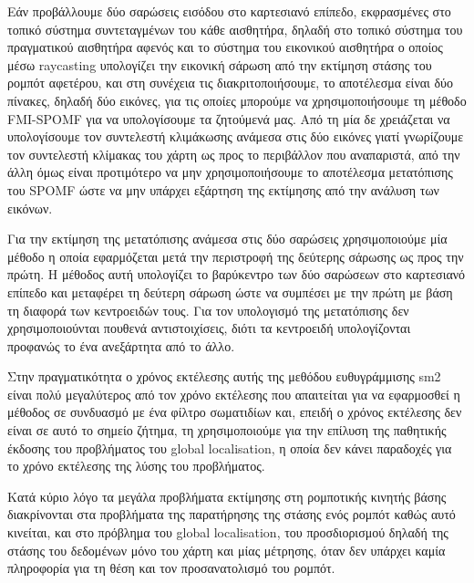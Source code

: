 \documentclass[a4paper,10pt]{article}
\begin{document}
Εάν προβάλλουμε δύο σαρώσεις εισόδου στο καρτεσιανό επίπεδο, εκφρασμένες στο
τοπικό σύστημα συντεταγμένων του κάθε αισθητήρα, δηλαδή στο τοπικό σύστημα του
πραγματικού αισθητήρα αφενός και το σύστημα του εικονικού αισθητήρα ο οποίος
μέσω raycasting υπολογίζει την εικονική σάρωση από την εκτίμηση στάσης του
ρομπότ αφετέρου, και στη συνέχεια τις διακριτοποιήσουμε, το αποτέλεσμα είναι
δύο πίνακες, δηλαδή δύο εικόνες, για τις οποίες μπορούμε να
χρησιμοποιήσουμε τη μέθοδο FMI-SPOMF για να υπολογίσουμε τα ζητούμενά μας.  Από
τη μία δε χρειάζεται να υπολογίσουμε τον συντελεστή κλιμάκωσης ανάμεσα στις δύο
εικόνες γιατί γνωρίζουμε τον συντελεστή κλίμακας του χάρτη ως προς το
περιβάλλον που αναπαριστά, από την άλλη όμως είναι προτιμότερο να μην
χρησιμοποιήσουμε το αποτέλεσμα μετατόπισης του SPOMF ώστε να μην υπάρχει
εξάρτηση της εκτίμησης από την ανάλυση των εικόνων.

Για την εκτίμηση της μετατόπισης ανάμεσα στις δύο σαρώσεις χρησιμοποιούμε μία
μέθοδο η οποία εφαρμόζεται μετά την περιστροφή της δεύτερης σάρωσης ως προς την
πρώτη. Η μέθοδος αυτή υπολογίζει το βαρύκεντρο των δύο σαρώσεων στο
καρτεσιανό επίπεδο και μεταφέρει τη δεύτερη σάρωση ώστε να συμπέσει με την
πρώτη με βάση τη διαφορά των κεντροειδών τους. Για τον υπολογισμό της
μετατόπισης δεν χρησιμοποιούνται πουθενά αντιστοιχίσεις, διότι τα κεντροειδή
υπολογίζονται προφανώς το ένα ανεξάρτητα από το άλλο.

Στην πραγματικότητα ο χρόνος εκτέλεσης αυτής της μεθόδου ευθυγράμμισης sm2
είναι πολύ μεγαλύτερος από τον χρόνο εκτέλεσης που απαιτείται για να εφαρμοσθεί
η μέθοδος σε συνδυασμό με ένα φίλτρο σωματιδίων και, επειδή ο χρόνος εκτέλεσης
δεν είναι σε αυτό το σημείο ζήτημα, τη χρησιμοποιούμε για την επίλυση της
παθητικής έκδοσης του προβλήματος του global localisation, η οποία δεν κάνει
παραδοχές για το χρόνο εκτέλεσης της λύσης του προβλήματος.

Κατά κύριο λόγο τα μεγάλα προβλήματα εκτίμησης στη ρομποτικής κινητής βάσης
διακρίνονται στα προβλήματα της παρατήρησης της στάσης ενός ρομπότ καθώς αυτό
κινείται, και στο πρόβλημα του global localisation, του προσδιορισμού δηλαδή
της στάσης του δεδομένων μόνο του χάρτη και μίας μέτρησης, όταν δεν υπάρχει
καμία πληροφορία για τη θέση και τον προσανατολισμό του ρομπότ.
\end{document}
